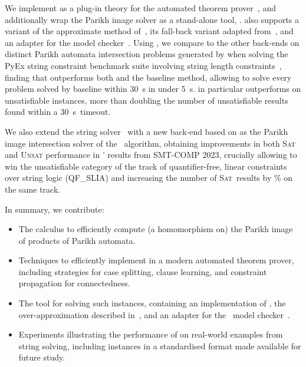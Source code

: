 We implement \Calculus{} as a plug-in theory for the \Princess{} automated
theorem prover~\cite{princess}, and additionally wrap the Parikh image solver as a stand-alone tool, \Catra{}.
\Catra{} also supports a variant of the approximate method of~\cite{approximate-parikh}, its fall-back variant adapted
from~\cite{generate-parikh-image}, and an adapter for the \Nuxmv{} model
checker~\cite{nuxmv}. Using \Catra, we compare \Calculus{} to the other 
back-ends on \NrBenchmarks{} distinct Parikh automata intersection problems
generated by \OstrichPlus{} when solving the PyEx string constraint benchmark
suite involving string length constraints~\cite{pyex}, finding that \Calculus{}
outperforms both \Nuxmv{} and the baseline method, allowing \Calculus{}
to solve every problem solved by baseline within \SI{30}{s} in under \SI{5}{s}.
\Calculus{} in particular outperforms \Nuxmv{} on unsatisfiable instances, more than 
doubling the number of unsatisfiable results found within a \SI{30}{s}~timeout.

We also extend the \Ostrich{} string solver~\cite{ostrich} with a new back-end
based on \Catra{} as the Parikh image intersection solver of
the \OstrichPlus{}~algorithm, obtaining improvements in both
\textsc{Sat} and \textsc{Unsat} performance in \Ostrich{}' results
from SMT-COMP 2023, crucially allowing \Ostrich{} to win the
unsatisfiable category of the track of quantifier-free, linear
constraints over string logic (QF\_SLIA) and increasing the number of
\textsc{Sat}~results by \% on the same track.



In summary, we contribute:
\begin{itemize}
    \item The \Calculus{} calculus to efficiently compute (a homomorphism on)
          the Parikh image of products of Parikh automata.
    \item Techniques to efficiently implement \Calculus{} in a modern
    automated theorem prover, including strategies for case splitting, clause
    learning, and constraint propagation for connectedness.
    \item The \Catra{} tool for solving such instances, containing an
    implementation of \Calculus{}, the over-approximation described
    in~\cite{approximate-parikh}, and an adapter for the~\Nuxmv{} model
    checker~\cite{nuxmv}.
    \item Experiments illustrating the performance of \Calculus{} on real-world
    examples from string solving, including \NrBenchmarks{} instances in a
    standardised format made available for future study.
\end{itemize}

